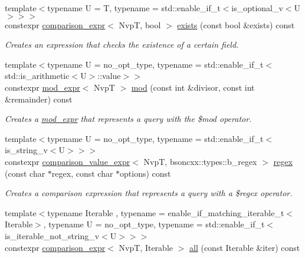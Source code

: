\begin{DoxyCompactItemize}
{\footnotesize template$<$typename U  = T, typename  = std\+::enable\+\_\+if\+\_\+t$<$is\+\_\+optional\+\_\+v$<$\+U$>$$>$$>$ }\\constexpr \hyperlink{classmangrove_1_1comparison__expr}{comparison\+\_\+expr}$<$ NvpT, bool $>$ \hyperlink{classmangrove_1_1nvp__base_a43fcb75163884d6d6582f53625b20226}{exists} (const bool \&exists) const 
\begin{DoxyCompactList}\small\item\em Creates an expression that checks the existence of a certain field. \end{DoxyCompactList}\item 
{\footnotesize template$<$typename U  = no\+\_\+opt\+\_\+type, typename  = std\+::enable\+\_\+if\+\_\+t$<$std\+::is\+\_\+arithmetic$<$\+U$>$\+::value$>$$>$ }\\constexpr \hyperlink{classmangrove_1_1mod__expr}{mod\+\_\+expr}$<$ NvpT $>$ \hyperlink{classmangrove_1_1nvp__base_af17554cee50b9cf7146ef81276190966}{mod} (const int \&divisor, const int \&remainder) const 
\begin{DoxyCompactList}\small\item\em Creates a \hyperlink{classmangrove_1_1mod__expr}{mod\+\_\+expr} that represents a query with the \$mod operator. \end{DoxyCompactList}\item 
{\footnotesize template$<$typename U  = no\+\_\+opt\+\_\+type, typename  = std\+::enable\+\_\+if\+\_\+t$<$is\+\_\+string\+\_\+v$<$\+U$>$$>$$>$ }\\constexpr \hyperlink{classmangrove_1_1comparison__value__expr}{comparison\+\_\+value\+\_\+expr}$<$ NvpT, bsoncxx\+::types\+::b\+\_\+regex $>$ \hyperlink{classmangrove_1_1nvp__base_a0c9da6ea8ec8cec0bcdba273cd5f1bd7}{regex} (const char $\ast$regex, const char $\ast$options) const 
\begin{DoxyCompactList}\small\item\em Creates a comparison expression that represents a query with a \$regex operator. \end{DoxyCompactList}\item 
{\footnotesize template$<$typename Iterable , typename  = enable\+\_\+if\+\_\+matching\+\_\+iterable\+\_\+t$<$\+Iterable$>$, typename U  = no\+\_\+opt\+\_\+type, typename  = std\+::enable\+\_\+if\+\_\+t$<$is\+\_\+iterable\+\_\+not\+\_\+string\+\_\+v$<$\+U$>$$>$$>$ }\\constexpr \hyperlink{classmangrove_1_1comparison__expr}{comparison\+\_\+expr}$<$ NvpT, Iterable $>$ \hyperlink{classmangrove_1_1nvp__base_aa27deff6976c96110fbb92e3161edf18}{all} (const Iterable \&iter) const 

\end{DoxyCompactItemize}
